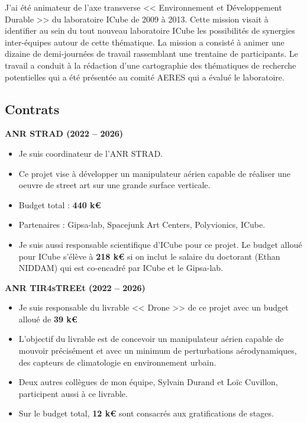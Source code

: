 \documentclass[a4paper,12pt]{article}
\begin{document}
J'ai été animateur de l'axe transverse << Environnement et Développement Durable >> du laboratoire ICube de 2009 à 2013. Cette mission visait à identifier au sein du tout nouveau laboratoire ICube les possibilités de synergies inter-équipes autour de cette thématique. La mission a consisté à animer une dizaine de demi-journées de travail rassemblant une trentaine de participants. Le travail a conduit à la rédaction d'une cartographie des thématiques de recherche potentielles qui a été présentée au comité AERES qui a évalué le laboratoire.

\subsection{Contrats}

\textbf{ANR STRAD (2022 -- 2026)}

\begin{itemize}
    \item Je suis coordinateur de l’ANR STRAD.
    \item Ce projet vise à développer un manipulateur aérien capable de réaliser une oeuvre de street art sur une grande surface verticale.
    \item Budget total : \textbf{440 k€}
    \item Partenaires : Gipsa-lab, Spacejunk Art Centers, Polyvionics, ICube.
    \item Je suis aussi responsable scientifique d'ICube pour ce projet. Le budget alloué pour ICube s'élève à \textbf{218 k€} si on inclut le salaire du doctorant (Ethan NIDDAM) qui est co-encadré par ICube et le Gipsa-lab.
\end{itemize}

\textbf{ANR TIR4sTREEt (2022 -- 2026)}

\begin{itemize}
    \item Je suis responsable du livrable << Drone >> de ce projet avec un budget alloué de \textbf{39 k€}
    \item L’objectif du livrable est de concevoir un manipulateur aérien capable de mouvoir précisément et avec un minimum de perturbations aérodynamiques, des capteurs de climatologie en environnement urbain. 
    \item Deux autres collègues de mon équipe, Sylvain Durand et Loïc Cuvillon, participent aussi à ce livrable. 
    \item Sur le budget total, \textbf{12 k€} sont consacrés aux gratifications de stages.
\end{itemize}
\end{document}
